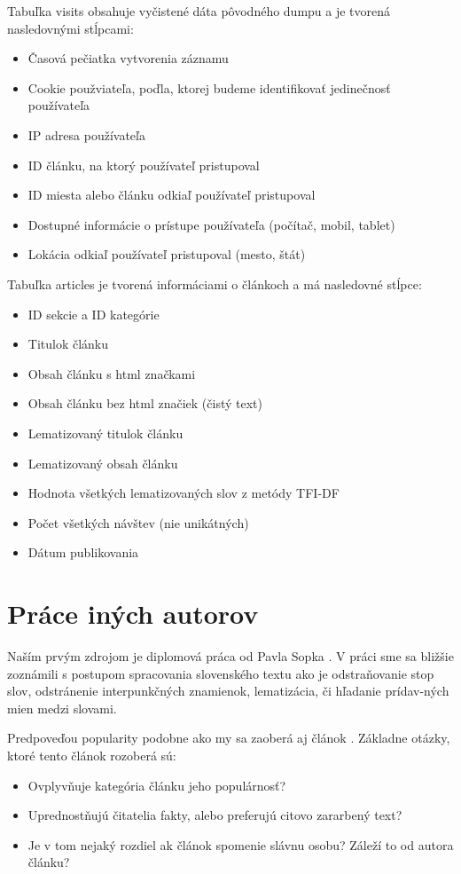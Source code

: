 \documentclass[runningheads,a4paper]{llncs}
\begin{document}
Tabuľka visits obsahuje vyčistené dáta pôvodného dumpu a je tvorená nasledovnými stĺpcami:
\begin{itemize}
\renewcommand{\labelitemi}{$\bullet$}
  \item Časová pečiatka vytvorenia záznamu
  \item Cookie použviateľa, poďla, ktorej budeme identifikovať jedinečnosť používateľa
  \item IP adresa používateľa
  \item ID článku, na ktorý používateľ pristupoval
  \item ID miesta alebo článku odkiaľ používateľ pristupoval
  \item Dostupné informácie o prístupe používateľa (počítač, mobil, tablet)
  \item Lokácia odkiaľ používateľ pristupoval (mesto, štát)
\end{itemize}

Tabuľka articles je tvorená informáciami o článkoch a má nasledovné stĺpce:
\begin{itemize}
\renewcommand{\labelitemi}{$\bullet$}
  \item ID sekcie a ID kategórie
  \item Titulok článku
  \item Obsah článku s html značkami
  \item Obsah článku bez html značiek (čistý text) 
  \item Lematizovaný titulok článku
  \item Lematizovaný obsah článku
  \item Hodnota všetkých lematizovaných slov z metódy TFI-DF 
  \item Počet všetkých návštev (nie unikátných)  
  \item Dátum publikovania
\end{itemize}

\section{Práce iných autorov}
Naším prvým zdrojom je diplomová práca od Pavla Sopka \cite{diplomovka}. 
V práci sme sa bližšie zoznámili s postupom spracovania slovenského textu ako je odstraňovanie stop slov, odstránenie interpunkčných znamienok, lematizácia, či hľadanie prídav-ných mien medzi slovami. 

Predpoveďou popularity podobne ako my sa zaoberá aj článok  \cite{pulse}. Základne otázky, ktoré tento článok rozoberá sú:
\begin{itemize}
\renewcommand{\labelitemi}{$\bullet$}
  \item Ovplyvňuje kategória článku jeho populárnosť?
  \item Uprednostňujú čitatelia fakty, alebo preferujú citovo zararbený text?
  \item Je v tom nejaký rozdiel ak článok spomenie slávnu osobu? Záleží to od autora článku?
\end{itemize}
\end{document}
